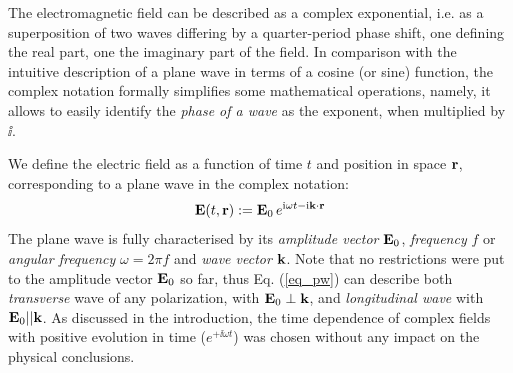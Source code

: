 The electromagnetic field can be described as a complex exponential, i.e. as a superposition of two waves differing by a quarter-period phase shift, one defining the real part, one the imaginary part of the field. In comparison with the intuitive description of a plane wave in terms of a cosine (or sine) function, the complex notation formally simplifies some mathematical operations, namely, it allows to easily identify the \textit{phase of a wave} as the exponent, when multiplied by $\ii$. 

We define the electric field as a function of time $t$ and position in space ${\mathbf{r}}$, corresponding to a plane wave in the complex notation:
\begin{equation} \mathbf{E}(t, {\mathbf{r}}) := \mathbf{E}_0\, e^{{\mathrm i}\omega t - {\mathrm i}{\mathbf{k}}\cdot{\mathbf{r}}} \label{eq_pw}\end{equation}
The plane wave is fully characterised by its \textit{amplitude vector} $\mathbf{E}_0$, \textit{frequency} $f$ or \textit{angular frequency} $\omega = 2\pi f$ and \textit{wave vector} ${\mathbf{k}}$. Note that no restrictions were put to the amplitude vector $\mathbf{E}_0$ so far, thus Eq. (\ref{eq_pw}) can describe both \textit{transverse} wave of any polarization, with $\mathbf{E}_0 \perp {\mathbf{k}}$, and \textit{longitudinal wave} with $\mathbf{E}_0 || {\mathbf{k}}$.  As discussed in the introduction, the time dependence of complex fields with positive evolution in time ($e^{+\ii\omega t}$)  was chosen without any impact on the physical conclusions.

